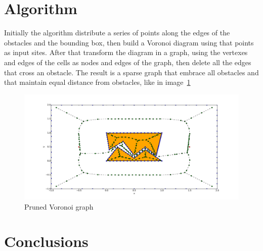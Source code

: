 \documentclass[a4paper]{article}
\begin{document}
\section{Algorithm}
Initially the algorithm distribute a series of points along the edges
of the obstacles and the bounding box, then build a Voronoi diagram
using that points as
input sites. After that transform the diagram in a graph, using the
vertexes and edges of the cells as nodes and edges of the graph, then
delete all the edges that cross an obstacle. The result is a sparse
graph that embrace all obstacles and that maintain equal distance from
obstacles, like in image~\ref{fig:voronoi}
\begin{figure}[htb]
  \centering
  \includegraphics[width=\textwidth]{img/voronoi.pdf}
  \caption{Pruned Voronoi graph}
  \label{fig:voronoi}
\end{figure}

\section{Conclusions}
\end{document}

